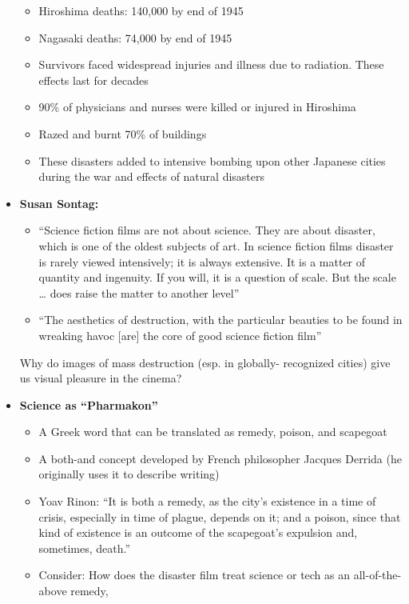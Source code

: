 \documentclass[11pt,fleqn]{book}
\begin{document}
\begin{itemize}
\begin{itemize}
        \item Hiroshima deaths: 140,000 by end of 1945
        \item Nagasaki deaths: 74,000 by end of 1945
        \item Survivors faced widespread injuries and illness due to radiation. These effects last for decades
        \item 90\% of physicians and nurses were killed or injured in Hiroshima
        \item Razed and burnt 70\% of buildings
        \item These disasters added to intensive bombing upon other Japanese cities during the
war and effects of natural disasters
    \end{itemize}
    \item \textbf{Susan Sontag:}
    \begin{itemize}
        \item \enquote{Science fiction films are not about science. They are about disaster, which is
one of the oldest subjects of art. In science fiction films disaster is rarely
viewed intensively; it is always extensive. It is a matter of quantity and
ingenuity. If you will, it is a question of scale. But the scale … does raise the
matter to another level}
        \item \enquote{The aesthetics of destruction, with the particular beauties to be found in
wreaking havoc [are] the core of good science fiction film}
    \end{itemize}
    \begin{remark}
        Why do images of mass destruction (esp. in globally-
recognized cities) give us visual pleasure in the cinema?
    \end{remark}
    \item \textbf{Science as \enquote{Pharmakon}}
    \begin{itemize}
        \item A Greek word that can be translated as remedy, poison, and scapegoat
        \item A both-and concept developed by French philosopher Jacques Derrida (he originally uses it to describe writing)
        \item Yoav Rinon: \enquote{It is both a remedy, as the city's existence in a time of crisis, especially in time of plague,
depends on it; and a poison, since that kind of existence is an outcome of the scapegoat's
expulsion and, sometimes, death.}
        \item Consider: How does the disaster film treat science or tech as an all-of-the-above remedy,

\end{itemize}
\end{itemize}
\end{document}
